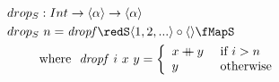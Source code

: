\documentclass[preview]{standalone}
\begin{document}
\begin{align*}
  drop_S &: Int \rightarrow \vect{\alpha} \rightarrow \vect{\alpha} \\
  drop_S &\ n = \mathit{dropf} \redS \vect{1,2,...} \circ \vect{} \fMapS\\
         & \text{where}\ \ \mathit{dropf}\ i\ x\ y = 
           \left\{\begin{array}{ll}
                    x \fcat y & \text{ if } i > n\\
                    y & \text{ otherwise}
                  \end{array}
           \right.\\
\end{align*}
\end{document}
